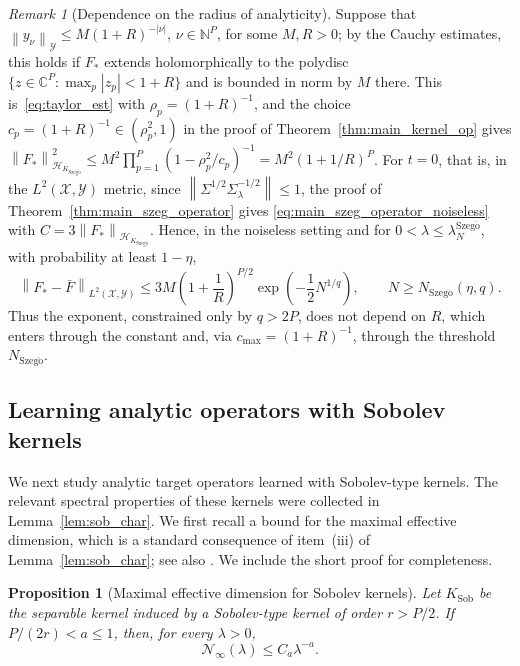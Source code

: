 \documentclass[11pt]{article}
\numberwithin{equation}{section}
\theoremstyle{plain}
\newtheorem{proposition}[theorem]{Proposition}
\theoremstyle{definition}
\theoremstyle{remark}
\newtheorem{remark}[theorem]{Remark}
\newcommand{\X}{\mathcal{X}}
\newcommand{\Hs}{\mathcal{H}}
\newcommand{\Y}{\mathcal{Y}}
\newcommand{\norm}[1]{\left\lVert#1\right\rVert}
\newcommand{\abs}[1]{\left|#1\right|}
\begin{document}
\begin{remark}[Dependence on the radius of analyticity]
\label{rem:analyticity_radius}
Suppose that $\norm{y_\nu}_{\Y}\leq M(1+R)^{-\abs{\nu}}$,
$\nu\in\mathbb{N}^P$, for some $M,R>0$; by the Cauchy estimates, this holds
if $F_*$ extends holomorphically to the polydisc
$\{z\in\mathbb{C}^P:\max_p\abs{z_p}<1+R\}$ and is bounded in norm by $M$
there. This is~\eqref{eq:taylor_est} with $\rho_p=(1+R)^{-1}$, and the choice
$c_p=(1+R)^{-1}\in(\rho_p^2,1)$ in the proof of
Theorem~\ref{thm:main_kernel_op} gives
$\norm{F_*}_{\Hs_{K_{\mathrm{Szeg\ddot{o}}}}}^2\leq
M^2\prod_{p=1}^P(1-\rho_p^2/c_p)^{-1}=M^2(1+1/R)^P$. For $t=0$, that is, in the $L^2(\X,\Y)$ metric, since
$\norm{\Sigma^{1/2}\Sigma_\lambda^{-1/2}}\leq1$, the proof of
Theorem~\ref{thm:main_szeg_operator} gives
\eqref{eq:main_szeg_operator_noiseless} with
$C=3\norm{F_*}_{\Hs_{K_{\mathrm{Szeg\ddot{o}}}}}$. Hence, in the noiseless setting
and for $0<\lambda\leq\lambda_N^{\mathrm{Szeg\ddot{o}}}$, with probability at least
$1-\eta$,
\[
\norm{F_*-\bar{F}}_{L^2(\X,\Y)}
\leq
3M\left(1+\frac{1}{R}\right)^{P/2}
\exp\left(-\frac{1}{2}N^{1/q}\right),
\qquad
N\geq N_{\mathrm{Szeg\ddot{o}}}(\eta,q).
\]
Thus the exponent, constrained only by $q>2P$, does not depend on $R$,
which enters through the constant and, via $c_{\max}=(1+R)^{-1}$, through
the threshold $N_{\mathrm{Szeg\ddot{o}}}$.
\end{remark}

\subsection{Learning analytic operators with Sobolev kernels}
\label{subsec:sob}

We next study analytic target operators learned with Sobolev-type kernels. The
relevant spectral properties of these kernels were collected in
Lemma~\ref{lem:sob_char}. We first recall a  bound for the
maximal effective dimension, which is a standard consequence
of item~(iii) of Lemma~\ref{lem:sob_char}; see also
\cite{fischer2020sobolev,zhang2024optimality}. We include the short proof for
completeness.

\begin{proposition}[Maximal effective dimension for Sobolev kernels]
\label{prop:max_dof_sob}
Let $K_{\mathrm{Sob}}$ be the separable kernel induced by a Sobolev-type
kernel of order $r>P/2$. If
$P/(2r)<a\leq1$,
then, for every $\lambda>0$,
\begin{equation}
\mathcal{N}_{\infty}(\lambda)
\leq
C_a\lambda^{-a}.
\label{eq:max_dof_sobolev}
\end{equation}
\end{proposition}
\end{document}
